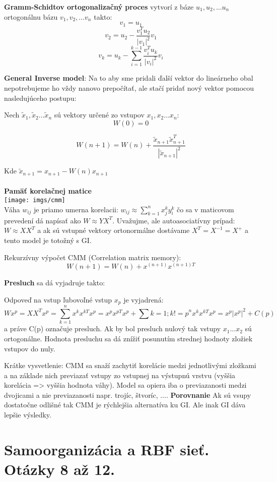 \documentclass{article}
\numberwithin{equation}{section} %
\begin{document}
\textbf{Gramm-Schidtov ortogonalizačný proces} vytvorí z báze $u_1, u_2, \dots u_n$ ortogonálnu bázu $v_1, v_2, \dots v_n$ takto:
$$v_1 = u_1$$
$$v_2 = u_2 - \frac{v_1^Tu_2}{|v_1|^2}v_1$$
$$v_k = u_k - \sum_{i=1}^{k-1}{\frac{v_i^Tu_k}{|v_i|^2}v_i}$$

\textbf{General Inverse model}: 
Na to aby sme pridali ďalší vektor do lineárneho obal nepotrebujeme ho vždy nanovo prepočítať, ale stačí pridať nový vektor pomocou nasledujúceho postupu:


Nech $\widetilde{x}_1, \widetilde{x}_2 \dots \widetilde{x}_n$ sú vektory určené zo vstupov $x_1, x_2 \dots x_n$:
$$W(0) = 0$$

$$W(n+1) = W(n) + \frac{\widetilde{x}_{n+1} \widetilde{x}_{n+1}^T}{|\widetilde{x}_{n+1}|^2}$$

Kde $\widetilde{x}_{n+1} = x_{n+1} - W(n) x_{n+1}$
\\\\
\textbf{Pamäť korelačnej matice}\\
\texttt{[image: imgs/cmm]}\\
Váha $w_{ij}$ je priamo  umerna korelacii: $w_{ij} \approx \sum_{k=1}^n x_{j}^ky_{i}^k$ čo sa v maticovom prevedení dá napísať ako $W \approx YX^T$. Uvažujme, ale autoasociatívny prípad: $W \approx X X^T$ a ak sú vstupné vektory ortonormálne dostávame $X^T = X^{-1} = X^+$ a tento model je totožný s GI.

Rekurzívny výpočet CMM (Correlation matrix memory):
$$W(n+1) = W(n) + x^{(n+1)}  x^{(n+1)T}$$

\textbf{Presluch} sa dá vyjadruje takto: 

Odpoveď na vstup ľubovoľné vstup $x_p$ je vyjadrená: $$Wx^p = X X^T x^p = \sum_{k=1}^n x^k x^{kT} x^p = x^p x^{pT} x^p + \sum{k=1;k!=p}^n x^k x^{kT} x^p = x^p |x^p|^2 + C(p)$$ a práve C(p) označuje presluch. Ak by bol presluch nulový tak vstupy $x_1 \dots x_2$ sú ortogonálne. Hodnota presluchu sa dá znížiť posunutím strednej hodnoty zložiek vstupov do nuly.

Krátke vysvetlenie: CMM sa snaží zachytiť korelácie medzi jednotlivými zložkami a na základe nich previazať vstupy zo vstupnej na výstupnú vrstvu (vyššia korelácia => vyššia hodnota váhy). Model sa opiera iba o previazanosti medzi dvojicami a nie previazanosti napr. trojíc, štvoríc, .... 
\textbf{Porovnanie}
Ak sú vsupy dostatočne odlišné tak CMM je rýchlejšia alternatíva ku GI. Ale inak GI dáva lepšie výsledky. 

\section{Samoorganizácia a RBF sieť. Otázky 8 až 12.}
\end{document}
